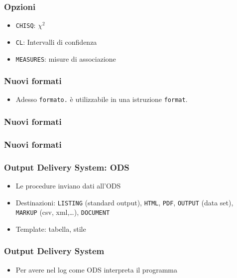 \begin{frame}[containsverbatim]\frametitle{Opzioni}
  \begin{itemize}
  \item
    \verb+CHISQ+: $\chi^2$
  \item
    \verb+CL+: Intervalli di confidenza
  \item
    \verb+MEASURES+: misure di associazione
  \end{itemize}
\end{frame}




\begin{frame}[containsverbatim]\frametitle{Nuovi formati}
  \begin{itemize}
  \item
    Adesso \texttt{formato.} {\`e} utilizzabile in una istruzione  \texttt{format}.
  \end{itemize}
\end{frame}

\begin{frame}[containsverbatim]\frametitle{Nuovi formati}
\end{frame}


\begin{frame}[containsverbatim]\frametitle{Nuovi formati}
\end{frame}

\begin{frame}[containsverbatim]\frametitle{Output Delivery System: ODS}
  \begin{itemize}
  \item
    Le procedure inviano dati all'ODS
  \item
    Destinazioni: \verb+LISTING+ (standard output), \verb+HTML+, \verb+PDF+,
    \verb+OUTPUT+ (data set), \verb+MARKUP+ (csv, xml,\ldots), \verb+DOCUMENT+
  \item
    Template: tabella, stile
  \end{itemize}
\end{frame}


\begin{frame}[containsverbatim]\frametitle{Output Delivery System}
  \begin{itemize}
  \item
    Per avere nel log come ODS interpreta il programma
  \end{itemize}
\end{frame}


